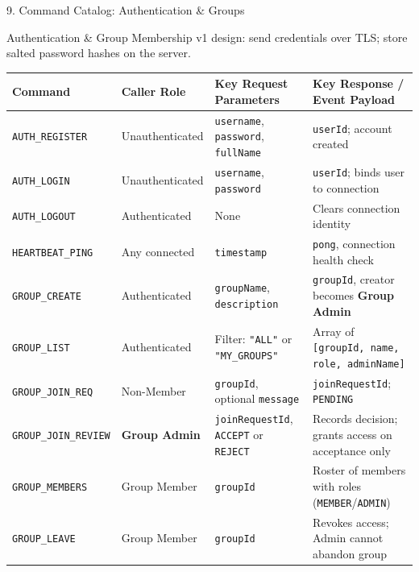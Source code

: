 \documentclass[t, aspectratio=169]{beamer}
\begin{document}
\begin{frame}{9. Command Catalog: Authentication \& Groups}
\small
\begin{block}{Authentication \& Group Membership}
\scriptsize v1 design: send credentials over TLS; store salted password hashes on the server.
\end{block}
\vspace{-4pt}
\centering
\scriptsize
\setlength{\tabcolsep}{3pt}
\renewcommand{\arraystretch}{0.98}
\begin{tabularx}{\textwidth}{llp{4.2cm}X}
\toprule
\textbf{Command} & \textbf{Caller Role} & \textbf{Key Request Parameters} & \textbf{Key Response / Event Payload} \\
\midrule
\texttt{AUTH\_REGISTER} & Unauthenticated & \texttt{username}, \texttt{password}, \texttt{fullName} & \texttt{userId}; account created \\
\texttt{AUTH\_LOGIN} & Unauthenticated & \texttt{username}, \texttt{password} & \texttt{userId}; binds user to connection \\
\texttt{AUTH\_LOGOUT} & Authenticated & None & Clears connection identity \\
\texttt{HEARTBEAT\_PING} & Any connected & \texttt{timestamp} & \texttt{pong}, connection health check \\
\midrule
\texttt{GROUP\_CREATE} & Authenticated & \texttt{groupName}, \texttt{description} & \texttt{groupId}, creator becomes \textbf{Group Admin} \\
\texttt{GROUP\_LIST} & Authenticated & Filter: \texttt{"ALL"} or \texttt{"MY\_GROUPS"} & Array of \texttt{[groupId, name, role, adminName]} \\
\texttt{GROUP\_JOIN\_REQ} & Non-Member & \texttt{groupId}, optional \texttt{message} & \texttt{joinRequestId}; \texttt{PENDING} \\
\texttt{GROUP\_JOIN\_REVIEW} & \textbf{Group Admin} & \texttt{joinRequestId}, \texttt{ACCEPT} or \texttt{REJECT} & Records decision; grants access on acceptance only \\
\texttt{GROUP\_MEMBERS} & Group Member & \texttt{groupId} & Roster of members with roles (\texttt{MEMBER}/\texttt{ADMIN}) \\
\texttt{GROUP\_LEAVE} & Group Member & \texttt{groupId} & Revokes access; Admin cannot abandon group \\
\bottomrule
\end{tabularx}
\end{frame}
\end{document}
